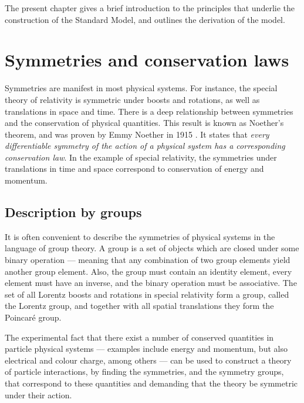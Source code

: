 \documentclass[twoside,english]{uiofysmaster}
\begin{document}
The present chapter gives a brief introduction to the principles that underlie the construction of the Standard Model, and outlines the derivation of the model. 

\section{Symmetries and conservation laws}
Symmetries are manifest in most physical systems. For instance, the special theory of relativity is symmetric under boosts and rotations, as well as translations in space and time. There is a deep relationship between symmetries and the conservation of physical quantities. This result is known as Noether's theorem, and was proven by Emmy Noether in 1915 \cite{Noether:1918zz}. It states that {\it every differentiable symmetry of the action of a physical system has a corresponding conservation law}. In the example of special relativity, the symmetries under translations in time and space correspond to conservation of energy and momentum.%

\subsection{Description by groups}
It is often convenient to describe the symmetries of physical systems in the language of group theory. A group is a set of objects which are closed under some binary operation --- meaning that any combination of two group elements yield another group element. Also, the group must contain an identity element, every element must have an inverse, and the binary operation must be associative. The set of all Lorentz boosts and rotations in special relativity form a group, called the Lorentz group, and together with all spatial translations they form the Poincar\'{e} group. 

The experimental fact that there exist a number of conserved quantities in particle physical systems --- examples include energy and momentum, but also electrical and colour charge, among others --- can be used to construct a theory of particle interactions, by finding the symmetries, and the symmetry groups, that correspond to these quantities and demanding that the theory be symmetric under their action.
\end{document}
